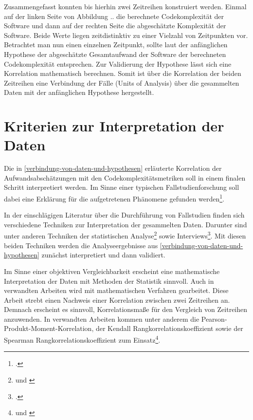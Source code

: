 Zusammengefasst konnten bis hierhin zwei Zeitreihen konstruiert werden.
Einmal auf der linken Seite von Abbildung .. die berechnete
Codekomplexität der Software und dann auf der rechten Seite die
abgeschätzte Komplexität der Software. Beide Werte liegen zeitdistinktiv
zu einer Vielzahl von Zeitpunkten vor. Betrachtet man nun einen
einzelnen Zeitpunkt, sollte laut der anfänglichen Hypothese der
abgeschätzte Gesamtaufwand der Software der berechneten Codekomplexität
entsprechen. Zur Validierung der Hypothese lässt sich eine Korrelation
mathematisch berechnen. Somit ist über die Korrelation der beiden
Zeitreihen eine Verbindung der Fälle (Units of Analysis) über die
gesammelten Daten mit der anfänglichen Hypothese hergestellt.

\section{Kriterien zur Interpretation der Daten}\label{kriterien-zur-interpretation-der-daten}

Die in \ref{verbindung-von-daten-und-hypothesen} erläuterte Korrelation der Aufwandsabschätzungen mit den
Codekomplexitätsmetriken soll in einem finalen Schritt interpretiert
werden. Im Sinne einer typischen Fallstudienforschung soll dabei eine
Erklärung für die aufgetretenen Phänomene gefunden werden\footcite[Vgl. ][S. 11]{gothlichFallstudienAlsForschungsmethode2003}.

In der einschlägigen Literatur über die Durchführung von Fallstudien
finden sich verschiedene Techniken zur Interpretation der gesammelten
Daten. Darunter sind unter anderen Techniken der statistischen Analyse\footnote{\cite[Vgl .][S. 79]{yinCaseStudyResearch2014} und \cite[][S. 11]{gothlichFallstudienAlsForschungsmethode2003}} sowie Interviews\footcite[Vgl. ][S. 11]{gothlichFallstudienAlsForschungsmethode2003}. Mit diesen beiden
Techniken werden die Analyseergebnisse aus \ref{verbindung-von-daten-und-hypothesen} zunächst interpretiert
und dann validiert.

Im Sinne einer objektiven Vergleichbarkeit erscheint eine mathematische
Interpretation der Daten mit Methoden der Statistik sinnvoll. Auch in
verwandten Arbeiten wird mit mathematischen Verfahren gearbeitet. Diese
Arbeit strebt einen Nachweis einer Korrelation zwischen zwei Zeitreihen
an. Demnach erscheint es sinnvoll, Korrelationsma\ss e für den Vergleich
von Zeitreihen anzuwenden. In verwandten Arbeiten kommen unter anderem
die Pearson-Produkt-Moment-Korrelation, der Kendall
Rangkorrelationskoeffizient sowie der Spearman
Rangkorrelationskoeffizient zum Einsatz\footnote{\cite[Vgl. ][S. 140]{jayCyclomaticComplexityLines2009} und \cite[][]{hindleReadingLinesUsing2009}}.

